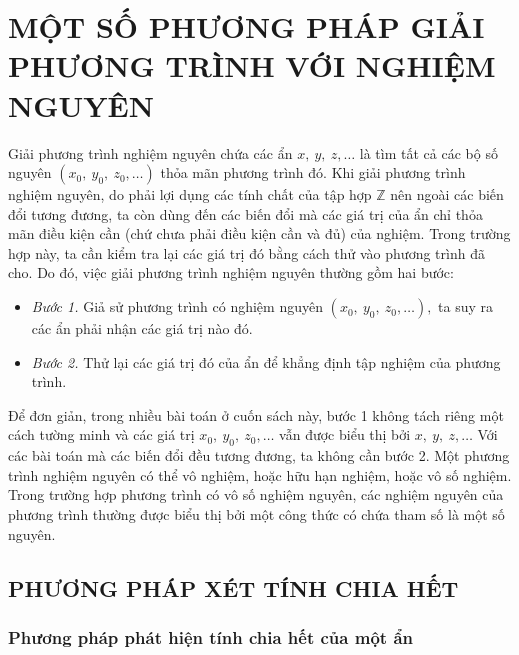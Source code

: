 \chapter{MỘT SỐ PHƯƠNG PHÁP GIẢI PHƯƠNG TRÌNH VỚI NGHIỆM NGUYÊN}

Giải phương trình nghiệm nguyên chứa các ẩn $x,\ y,\ z,\dots$ là tìm tất cả các bộ số nguyên $(x_0,\ y_0,\ z_0,\dots)$ thỏa mãn phương trình đó.
Khi giải phương trình nghiệm nguyên, do phải lợi dụng các tính chất của tập hợp $\mathbb{Z}$ nên ngoài các biến đổi tương đương, ta còn dùng đến các biến đổi mà các giá trị của ẩn chỉ thỏa mãn điều kiện cần (chứ chưa phải điều kiện cần và đủ) của nghiệm. Trong trường hợp này, ta cần kiểm tra lại các giá trị đó bằng cách thử vào phương trình đã cho.
Do đó, việc giải phương trình nghiệm nguyên thường gồm hai bước:
\begin{itemize}
	\item \textit{Bước 1.} Giả sử phương trình có nghiệm nguyên $(x_0,\ y_0,\ z_0,\dots),$ ta suy ra các ẩn phải nhận các giá trị nào đó.
\item \textit{Bước 2.} Thử lại các giá trị đó của ẩn để khẳng định tập nghiệm của phương trình.
\end{itemize}
Để đơn giản, trong nhiều bài toán ở cuốn sách này, bước 1 không tách riêng một cách tường minh và các giá trị $x_0,\ y_0,\ z_0,\dots$ vẫn được biểu thị bởi $x,\ y,\ z,\dots$ Với các bài toán mà các biến đổi đều tương đương, ta không cần bước 2.
Một phương trình nghiệm nguyên có thể vô nghiệm, hoặc hữu hạn nghiệm, hoặc vô số nghiệm. Trong trường hợp phương trình có vô số nghiệm nguyên, các nghiệm nguyên của phương trình thường được biểu thị bởi một công thức có chứa tham số là một số nguyên.\\  

\section{PHƯƠNG PHÁP XÉT TÍNH CHIA HẾT}

\subsection{Phương pháp phát hiện tính chia hết của một ẩn}

